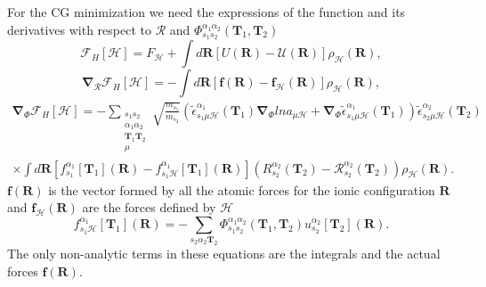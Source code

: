 For the CG minimization we need the expressions of the function and its derivatives with respect to $\boldsymbol{\mathcal{R}}$ and $\Phi_{s_{1}s_{2}}^{\alpha_{1}\alpha_{2}}(\mathbf{T}_{1},\mathbf{T}_{2})$
\begin{equation}
 \label{minim1}
 \mathcal{F}_{H}[\mathcal{H}]=F_{\mathcal{H}}+\int{d\mathbf{R}[U(\mathbf{R})-\mathcal{U}(\mathbf{R})]\rho_{\mathcal{H}}(\mathbf{R})},
\end{equation}
\begin{equation}
 \label{minim2}
 \boldsymbol{\nabla}_{\boldsymbol{\mathcal{R}}}\mathcal{F}_{H}[\mathcal{H}]=-\int{d\mathbf{R}[\mathbf{f}(\mathbf{R})-\mathbf{f}_{\mathcal{H}}(\mathbf{R})]\rho_{\mathcal{H}}(\mathbf{R})},
\end{equation}
\begin{multline}
 \label{minim3}
 \boldsymbol{\nabla}_{\Phi}\mathcal{F}_{H}[\mathcal{H}]=-\sum\limits_{\substack{s_{1}s_{2} \\ \alpha_{1}\alpha_{2} \\ \mathbf{T}_{1}\mathbf{T}_{2} \\ \mu}}\sqrt{\frac{m_{s_{1}}}{m_{s_{
 2}}}}(\tilde{\epsilon}_{s_{1}\mu\mathcal{H}}^{\alpha_{1}}(\mathbf{T}_{1})\boldsymbol{\nabla}_{\Phi}lna_{\mu\mathcal{H}}+\boldsymbol{\nabla}_{\Phi}\tilde{\epsilon}_{s_{1}\mu\mathcal{H}}^{\alpha_{1}}(\mathbf{T}_{1}))
 \tilde{\epsilon}_{s_{2}\mu\mathcal{H}}^{\alpha_{2}}(\mathbf{T}_{2}) \\ \times\int{d\mathbf{R}[f_{s_{1}}^{\alpha_{1}}[\mathbf{T}_{1}](\mathbf{R})-f_{s_{1}\mathcal{H}}^{\alpha_{1}}[\mathbf{T}_{1}](\mathbf{
 R})](R_{s_{2}}^{\alpha_{2}}(\mathbf{T}_{2})-\mathcal{R}_{s_{2}}^{\alpha_{2}}(\mathbf{T}_{2}))\rho_{\mathcal{H}}(\mathbf{R})}.
\end{multline}
$\mathbf{f}(\mathbf{R})$ is the vector formed by all the atomic forces for the ionic configuration $\mathbf{R}$ and $\mathbf{f}_{\mathcal{H}}(\mathbf{R})$ are the forces defined by $\mathcal{H}$
\begin{equation}
 f_{s_{1}\mathcal{H}}^{\alpha_{1}}[\mathbf{T}_{1}](\mathbf{R})=-\sum_{s_{2}\alpha_{2}\mathbf{T}_{2}}\Phi_{s_{1}s_{2}}^{\alpha_{1}\alpha_{2}}(\mathbf{T}_{1},\mathbf{T}_{2})u_{s_{2}}^{\alpha_{2}}[\mathbf{
 T}_{2}](\mathbf{R}).
\end{equation}
The only non-analytic terms in these equations are the integrals and the actual forces $\mathbf{f}(\mathbf{R})$. \\

